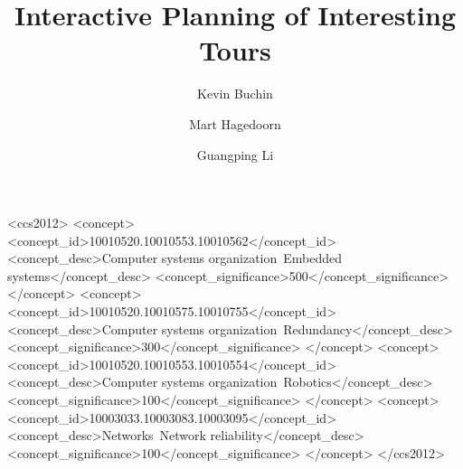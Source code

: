 \documentclass[acmsmall,natbib=false]{acmart}
\begin{document}
\title{Interactive Planning of Interesting Tours}


\author{Kevin Buchin}

\author{Mart Hagedoorn}

\author{Guangping Li}

\renewcommand{\shortauthors}{Buchin, Hagedoorn, and Li}
\newcommand{\tG}{\textsc{tourGenerator}}

\begin{abstract}
  
\end{abstract}

\begin{CCSXML}
<ccs2012>
 <concept>
  <concept_id>10010520.10010553.10010562</concept_id>
  <concept_desc>Computer systems organization~Embedded systems</concept_desc>
  <concept_significance>500</concept_significance>
 </concept>
 <concept>
  <concept_id>10010520.10010575.10010755</concept_id>
  <concept_desc>Computer systems organization~Redundancy</concept_desc>
  <concept_significance>300</concept_significance>
 </concept>
 <concept>
  <concept_id>10010520.10010553.10010554</concept_id>
  <concept_desc>Computer systems organization~Robotics</concept_desc>
  <concept_significance>100</concept_significance>
 </concept>
 <concept>
  <concept_id>10003033.10003083.10003095</concept_id>
  <concept_desc>Networks~Network reliability</concept_desc>
  <concept_significance>100</concept_significance>
 </concept>
</ccs2012>
\end{CCSXML}
\end{document}
